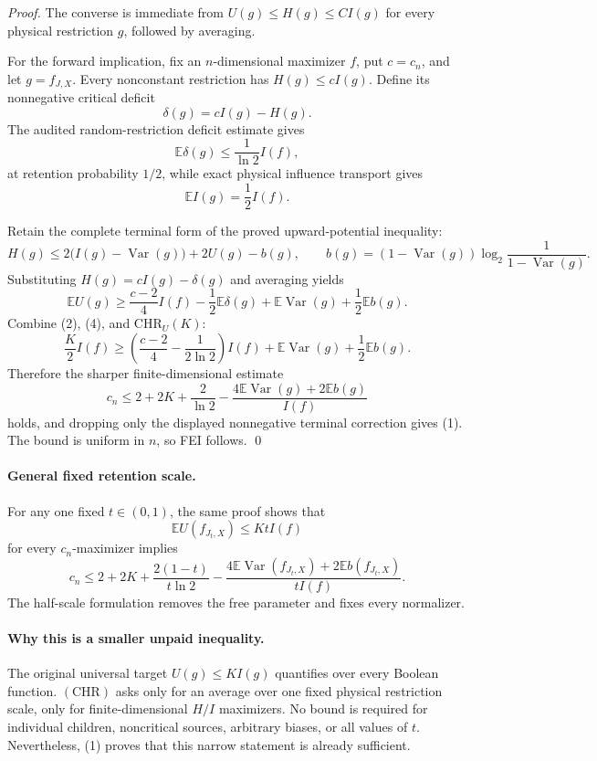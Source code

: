 \begin{proof}
The converse is immediate from $U(g)\le H(g)\le C I(g)$ for every physical
restriction $g$, followed by averaging.

For the forward implication, fix an $n$-dimensional maximizer $f$, put
$c=c_n$, and let $g=f_{J,X}$.  Every nonconstant restriction has
$H(g)\le cI(g)$.  Define its nonnegative critical deficit
\[
 \delta(g)=cI(g)-H(g).
\]
The audited random-restriction deficit estimate gives
\[
 \mathbb E\delta(g)\le\frac1{\ln2}I(f),                  \tag{2}
\]
at retention probability $1/2$, while exact physical influence transport
gives
\[
 \mathbb E I(g)=\frac12I(f).                             \tag{3}
\]

Retain the complete terminal form of the proved upward-potential inequality:
\[
 H(g)\le2\bigl(I(g)-\operatorname{Var}(g)\bigr)+2U(g)-b(g),\qquad
 b(g)=(1-\operatorname{Var}(g))\log_2\frac1{1-\operatorname{Var}(g)}.
\]
Substituting $H(g)=cI(g)-\delta(g)$ and averaging yields
\[
 \mathbb E U(g)\ge
 \frac{c-2}{4}I(f)-\frac12\mathbb E\delta(g)
 +\mathbb E\operatorname{Var}(g)+\frac12\mathbb E b(g). \tag{4}
\]
Combine (2), (4), and $\mathrm{CHR}_U(K)$:
\[
 \frac K2I(f)\ge
 \left(\frac{c-2}{4}-\frac1{2\ln2}\right)I(f)
 +\mathbb E\operatorname{Var}(g)+\frac12\mathbb E b(g).
\]
Therefore the sharper finite-dimensional estimate
\[
 c_n\le2+2K+\frac2{\ln2}
 -\frac{4\mathbb E\operatorname{Var}(g)+2\mathbb E b(g)}{I(f)}             \tag{5}
\]
holds, and dropping only the displayed nonnegative terminal correction gives
(1).  The bound is uniform in $n$, so FEI follows.  \qed
\end{proof}

\paragraph{General fixed retention scale.}
For any one fixed $t\in(0,1)$, the same proof shows that
\[
 \mathbb E U(f_{J_t,X})\le KtI(f)
\]
for every $c_n$-maximizer implies
\[
 c_n\le2+2K+\frac{2(1-t)}{t\ln2}
 -\frac{4\mathbb E\operatorname{Var}(f_{J_t,X})
        +2\mathbb E b(f_{J_t,X})}{tI(f)}.                \tag{6}
\]
The half-scale formulation removes the free parameter and fixes every
normalizer.

\paragraph{Why this is a smaller unpaid inequality.}
The original universal target $U(g)\le KI(g)$ quantifies over every Boolean
function.  $(\mathrm{CHR})$ asks only for an average over one fixed physical
restriction scale, only for finite-dimensional $H/I$ maximizers.  No bound is
required for individual children, noncritical sources, arbitrary biases, or
all values of $t$.  Nevertheless, (1) proves that this narrow statement is
already sufficient.

